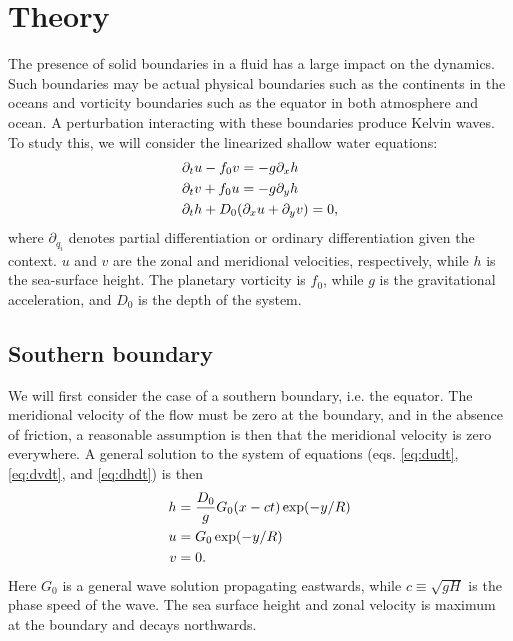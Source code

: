 \section{Theory}
\label{sec:theory}

The presence of solid boundaries in a fluid has a large impact on the dynamics. Such boundaries may be actual physical boundaries such as the continents in the oceans and vorticity boundaries such as the equator in both atmosphere and ocean. A perturbation interacting with these boundaries produce Kelvin waves. To study this, we will consider the linearized shallow water equations:
	\begin{align}
		&\partial_t u - f_0 v = -g \partial_x h \label{eq:dudt} \\
		&\partial_t v + f_0 u = -g \partial_y h \label{eq:dvdt} \\
		&\partial_t h + D_0 \qty(\partial_x u + \partial_y v) = 0, \label{eq:dhdt}
	\end{align}
where $\partial_{q_i}$ denotes partial differentiation or ordinary differentiation given the context. $u$ and $v$ are the zonal and meridional velocities, respectively, while $h$ is the sea-surface height. The planetary vorticity is $f_0$, while $g$ is the gravitational acceleration, and $D_0$ is the depth of the system.

\subsection{Southern boundary}
We will first consider the case of a southern boundary, i.e. the equator. The meridional velocity of the flow must be zero at the boundary, and in the absence of friction, a reasonable assumption is then that the meridional velocity is zero everywhere. A general solution to the system of equations (eqs. \eqref{eq:dudt}, \eqref{eq:dvdt}, and \eqref{eq:dhdt}) is then
	\begin{align}
		h &= \frac{D_0}{g} G_0\qty(x - ct)\exp(-y / R) \label{eq:h} \\
		u &= G_0 \exp(-y / R) \label{eq:u} \\
		v &= 0.
	\end{align}
Here $G_0$ is a general wave solution propagating eastwards, while $c \equiv \sqrt{gH}$ is the phase speed of the wave. The sea surface height and zonal velocity is maximum at the boundary and decays northwards.

